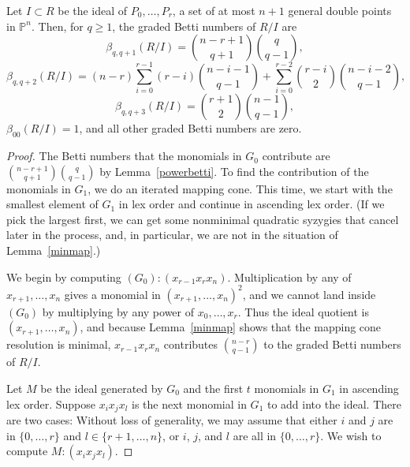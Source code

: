 \documentclass{article}
\begin{document}
\begin{proposition}
\label{doublepoints}
Let $I \subset R$ be the ideal of $P_0,\dots,P_r$, a set of at most $n+1$ general double points in $\mathbb P^n$. Then, for $q \ge 1$, the graded Betti numbers of $R/I$ are \[ \beta_{q,q+1}(R/I)={n-r+1 \choose q+1}{q \choose q-1},\] \[ \beta_{q,q+2}(R/I)= \left (n-r \right ) \sum_{i=0}^{r-1} \left (r-i \right ) {n-i-1 \choose q-1}+ \sum_{i=0}^{r-2} {r-i \choose 2}{n-i-2 \choose q-1},\] \[ \beta_{q,q+3}(R/I)={r+1 \choose 2}{n-1 \choose q-1},\] $\beta_{00}(R/I)=1$, and all other graded Betti numbers are zero.
\end{proposition}

\begin{proof}
The Betti numbers that the monomials in $G_0$ contribute are ${n-r+1 \choose q+1}{q \choose q-1}$ by Lemma~\ref{powerbetti}. To find the contribution of the monomials in $G_1$, we do an iterated mapping cone. This time, we start with the smallest element of $G_1$ in lex order and continue in ascending lex order. (If we pick the largest first, we can get some nonminimal quadratic syzygies that cancel later in the process, and, in particular, we are not in the situation of Lemma~\ref{minmap}.)

We begin by computing $(G_0):(x_{r-1}x_rx_n)$. Multiplication by any of $x_{r+1}, \dots,x_n$ gives a monomial in $(x_{r+1},\dots,x_n)^2$, and we cannot land inside $(G_0)$ by multiplying by any power of $x_0,\dots,x_r$. Thus the ideal quotient is $(x_{r+1},\dots,x_n)$, and because Lemma~\ref{minmap} shows that the mapping cone resolution is minimal, $x_{r-1}x_rx_n$ contributes ${n-r \choose q-1}$ to the graded Betti numbers of $R/I$.

Let $M$ be the ideal generated by $G_0$ and the first $t$ monomials in $G_1$ in ascending lex order. Suppose $x_ix_jx_l$ is the next monomial in $G_1$ to add into the ideal. There are two cases: Without loss of generality, we may assume that either $i$ and $j$ are in $\{0,\dots,r\}$ and $l \in \{r+1,\dots,n\}$, or $i$, $j$, and $l$ are all in $\{0,\dots,r\}$. We wish to compute $M:(x_ix_jx_l)$.


\end{proof}
\end{document}
